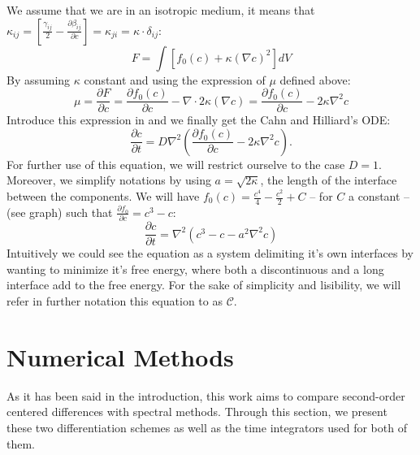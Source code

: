 \documentclass[10pt,a4paper,twocolumn]{article}
\begin{document}
We assume that we are in an isotropic medium, it means that $\kappa_{ij} = [\frac{\gamma_{ij}}{2} - \frac{\partial \beta_{ij}}{\partial c}] = \kappa_{ji} = \kappa \cdot\delta_{ij}$:
\begin{equation}
    F = \int [ f_0(c) + \kappa(\nabla c)^2]dV
\end{equation}
By assuming $\kappa$ constant and using the expression of $\mu$ defined above:
\begin{equation}
     \mu = \frac{\partial F}{\partial c} = \frac{\partial f_0(c)}{\partial c} - \nabla \cdot 2\kappa(\nabla c) = \frac{\partial f_0(c)}{\partial c} - 2\kappa\nabla^2 c
\end{equation}
Introduce this expression in  and we finally get the Cahn and Hilliard's ODE:
\begin{equation}
    \frac{\partial c}{\partial t} = D{\nabla^2} \left( \frac{\partial f_0(c)}{\partial c} - 2\kappa\nabla^2 c \right).
\end{equation}
For further use of this equation, we will restrict ourselve to the case $D = 1$. Moreover, we simplify notations by using $a = \sqrt{2\kappa}$, the length of the interface between the components. We will have $f_0(c) = \frac{c^4}{4} - \frac{c^2}{2} + C$ -- for $C$ a constant -- (see graph) such that  $\frac{\partial f_0}{\partial c} = c^3 - c$:
\begin{equation}
    \frac{\partial c}{\partial t} = {\nabla^2}(c^3 -c - a^2\nabla^2 c)
\end{equation}
Intuitively we could see the equation as a system delimiting it's own interfaces by wanting to minimize it's free energy, where both a discontinuous and a long interface add to the free energy. %
For the sake of simplicity and lisibility, we will refer in further notation this equation to as $\mathcal C$.

\section{Numerical Methods} %
\label{sec:numerical_methods}

As it has been said in the introduction, this work aims to compare second-order centered differences with spectral methods. Through this section, we present these two differentiation schemes as well as the time integrators used for both of them.
\end{document}
